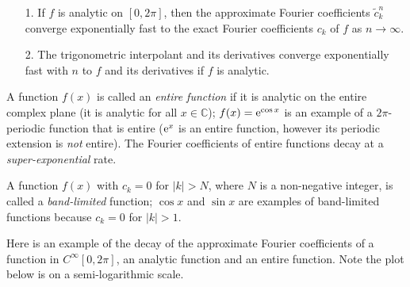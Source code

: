 \documentclass[12pt,a4paper]{article}
\begin{document}
\begin{itemize}
\item[1. ] If $f$ is analytic on $[0, 2\pi]$, then the approximate Fourier coefficients $\tilde{c}^n_k$ converge exponentially fast to the exact Fourier coefficients $c_k$ of $f$ as $n \to \infty$.   


\item[2. ] The trigonometric interpolant and its derivatives converge exponentially fast with $n$ to $f$ and its derivatives if $f$ is analytic.

\end{itemize}
A function $f(x)$ is called an \emph{entire function} if it is analytic on the entire complex plane (it is analytic for all $x \in \mathbb{C}$); $f(x) = {\rm e}^{\cos x}$ is an example of a $2\pi$-periodic function that is entire (${\rm e}^{x}$ is an entire function, however its periodic extension is \emph{not} entire). The Fourier coefficients of entire functions decay at a \emph{super-exponential} rate.

A function $f(x)$ with $c_{k} = 0$ for $\vert k \vert > N$, where $N$ is a non-negative integer, is called a \emph{band-limited} function; $\cos x$ and $\sin x$ are examples of band-limited functions because $c_{k} = 0$ for $\vert k \vert > 1$.

Here is an example of the decay of the approximate Fourier coefficients of a function in $C^{\infty}[0, 2\pi]$, an analytic function and an entire function. Note the plot below is on a semi-logarithmic scale.
\end{document}
